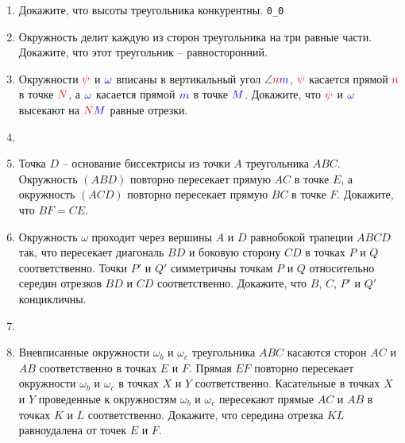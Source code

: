 \begin{enumerate}[resume*]
    \item Докажите, что высоты треугольника конкурентны. \texttt{0\_0} \wishlisted
    \item Окружность делит каждую из сторон треугольника на три равные части. Докажите, что этот треугольник -- равносторонний. \wishlisted
    \item Окружности ${\color{red}{\psi}}$ и ${\color{blue}{\omega}}$ вписаны в вертикальный угол $\angle {\color{red}{n}}{\color{blue}{m}}$, ${\color{red}{\psi}}$ касается прямой ${\color{red}{n}}$ в точке ${\color{red}{N}}$, а ${\color{blue}{\omega}}$ касается прямой ${\color{blue}{m}}$ в точке ${\color{blue}{M}}$. Докажите, что ${\color{red}{\psi}}$ и ${\color{blue}{\omega}}$ высекают на ${\color{red}{N}}{\color{blue}{M}}$ равные отрезки. \wishlisted
    \item {} \wishlisted
    \item Точка $D$ -- основание биссектрисы из точки $A$ треугольника $ABC$. Окружность $(ABD)$ повторно пересекает прямую $AC$ в точке $E$, а окружность $(ACD)$ повторно пересекает прямую $BC$ в точке $F$. Докажите, что $BF = CE$. \wishlisted
    \item Окружность $\omega$ проходит через вершины $A$ и $D$ равнобокой трапеции $ABCD$ так, что пересекает диагональ $BD$ и боковую сторону $CD$ в точках $P$ и $Q$ соответственно. Точки $P'$ и $Q'$ симметричны точкам $P$ и $Q$ относительно середин отрезков $BD$ и $CD$ соответственно. Докажите, что $B$, $C$, $P'$ и $Q'$ концикличны. \wishlisted
    \item {} 
    \item Вневписанные окружности $\omega_b$ и $\omega_c$ треугольника $ABC$ касаются сторон $AC$ и $AB$ соответственно в точках $E$ и $F$. Прямая $EF$ повторно пересекает окружности $\omega_b$ и $\omega_c$ в точках $X$ и $Y$ соответственно. Касательные в точках $X$ и $Y$ проведенные к окружностям $\omega_b$ и $\omega_c$ пересекают прямые $AC$ и $AB$ в точках $K$ и $L$ соответственно. Докажите, что середина отрезка $KL$ равноудалена от точек $E$ и $F$.

\end{enumerate}

